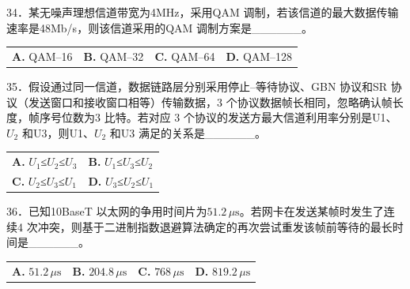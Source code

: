 \documentclass[UTF8,11pt]{ctexart}
\begin{document}
34．某无噪声理想信道带宽为4MHz，采用QAM 调制，若该信道的最大数据传输速率是48Mb/s，则该信道采用的QAM 调制方案是\_\_\_\_\_\_。


\begin{center}\begin{tabular}{>{\raggedright\arraybackslash}p{\dimexpr(\linewidth-8\tabcolsep)/4\relax}>{\raggedright\arraybackslash}p{\dimexpr(\linewidth-8\tabcolsep)/4\relax}>{\raggedright\arraybackslash}p{\dimexpr(\linewidth-8\tabcolsep)/4\relax}>{\raggedright\arraybackslash}p{\dimexpr(\linewidth-8\tabcolsep)/4\relax}}
\textbf{A.} QAM–16 & \textbf{B.} QAM–32 & \textbf{C.} QAM–64 & \textbf{D.} QAM–128\\[.35em]\end{tabular}\end{center}

35．假设通过同一信道，数据链路层分别采用停止–等待协议、GBN 协议和SR 协议（发送窗口和接收窗口相等）传输数据，3 个协议数据帧长相同，忽略确认帧长度，帧序号位数为3 比特。若对应 3 个协议的发送方最大信道利用率分别是U1、\(\displaystyle U_2\) 和U3，则U1、\(\displaystyle U_2\) 和U3 满足的关系是\_\_\_\_\_\_。


\begin{center}\begin{tabular}{>{\raggedright\arraybackslash}p{\dimexpr(\linewidth-4\tabcolsep)/2\relax}>{\raggedright\arraybackslash}p{\dimexpr(\linewidth-4\tabcolsep)/2\relax}}
\textbf{A.} \(\displaystyle U_1\)≤\(\displaystyle U_2\)≤\(\displaystyle U_3\) & \textbf{B.} \(\displaystyle U_1\)≤\(\displaystyle U_3\)≤\(\displaystyle U_2\)\\[.35em]
\textbf{C.} \(\displaystyle U_2\)≤\(\displaystyle U_3\)≤\(\displaystyle U_1\) & \textbf{D.} \(\displaystyle U_3\)≤\(\displaystyle U_2\)≤\(\displaystyle U_1\)\\[.35em]\end{tabular}\end{center}

36．已知10BaseT 以太网的争用时间片为\(\displaystyle 51.2\,\mu\mathrm{s}\)。若网卡在发送某帧时发生了连续4 次冲突，则基于二进制指数退避算法确定的再次尝试重发该帧前等待的最长时间是\_\_\_\_\_\_。


\begin{center}\begin{tabular}{>{\raggedright\arraybackslash}p{\dimexpr(\linewidth-8\tabcolsep)/4\relax}>{\raggedright\arraybackslash}p{\dimexpr(\linewidth-8\tabcolsep)/4\relax}>{\raggedright\arraybackslash}p{\dimexpr(\linewidth-8\tabcolsep)/4\relax}>{\raggedright\arraybackslash}p{\dimexpr(\linewidth-8\tabcolsep)/4\relax}}
\textbf{A.} \(\displaystyle 51.2\,\mu\mathrm{s}\) & \textbf{B.} \(\displaystyle 204.8\,\mu\mathrm{s}\) & \textbf{C.} \(\displaystyle 768\,\mu\mathrm{s}\) & \textbf{D.} \(\displaystyle 819.2\,\mu\mathrm{s}\)\\[.35em]\end{tabular}\end{center}
\end{document}
